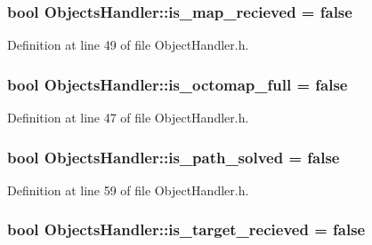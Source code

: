 \subsubsection[{\texorpdfstring{is\+\_\+map\+\_\+recieved}{is_map_recieved}}]{\setlength{\rightskip}{0pt plus 5cm}bool Objects\+Handler\+::is\+\_\+map\+\_\+recieved = false}\hypertarget{class_objects_handler_acf1ef1b318defc2a39d87cea72689478}{}\label{class_objects_handler_acf1ef1b318defc2a39d87cea72689478}


Definition at line 49 of file Object\+Handler.\+h.

\subsubsection[{\texorpdfstring{is\+\_\+octomap\+\_\+full}{is_octomap_full}}]{\setlength{\rightskip}{0pt plus 5cm}bool Objects\+Handler\+::is\+\_\+octomap\+\_\+full = false}\hypertarget{class_objects_handler_a56f70ac04c01e8b948a4b44fa5670f49}{}\label{class_objects_handler_a56f70ac04c01e8b948a4b44fa5670f49}


Definition at line 47 of file Object\+Handler.\+h.

\subsubsection[{\texorpdfstring{is\+\_\+path\+\_\+solved}{is_path_solved}}]{\setlength{\rightskip}{0pt plus 5cm}bool Objects\+Handler\+::is\+\_\+path\+\_\+solved = false}\hypertarget{class_objects_handler_ad8d1ea6646024f0a03e154a7c2c07682}{}\label{class_objects_handler_ad8d1ea6646024f0a03e154a7c2c07682}


Definition at line 59 of file Object\+Handler.\+h.

\subsubsection[{\texorpdfstring{is\+\_\+target\+\_\+recieved}{is_target_recieved}}]{\setlength{\rightskip}{0pt plus 5cm}bool Objects\+Handler\+::is\+\_\+target\+\_\+recieved = false}\hypertarget{class_objects_handler_a7691f3e1ec58e55ead30c50c555f169a}{}\label{class_objects_handler_a7691f3e1ec58e55ead30c50c555f169a}


